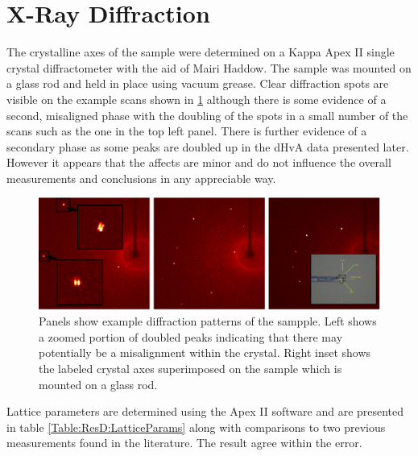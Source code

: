 
\section{X-Ray Diffraction}
    \label{Sec:ResD:XrayDiffraction}

The crystalline axes of the sample were determined on a Kappa Apex II single crystal diffractometer with the aid of Mairi Haddow. The sample was mounted on a glass rod and held in place using vacuum grease. Clear diffraction spots are visible on the example scans shown in \fig\ref{Fig:ResD:XRayDiffraction} although there is some evidence of a second, misaligned phase with the doubling of the spots in a small number of the scans such as the one in the top left panel. There is further evidence of a secondary phase as some peaks are doubled up in the dHvA data presented later. However it appears that the affects are minor and do not influence the overall measurements and conclusions in any appreciable way.
\begin{figure}[htbp]
    \begin{center}
        \includegraphics[scale=0.7]{Chapter-dHvABaFe2P2/Figures/Xrays/XRayDiffraction/XRayDiffraction}
        \caption{Panels show example diffraction patterns of the \BaFeP sampple. Left shows a zoomed portion of doubled peaks indicating that there may potentially be a misalignment within the crystal. Right inset shows the labeled crystal axes superimposed on the sample which is mounted on a glass rod.}
        \label{Fig:ResD:XRayDiffraction}
    \end{center}
\end{figure}
Lattice parameters are determined using the Apex II software and are presented in table \ref{Table:ResD:LatticeParams} along with comparisons to two previous measurements found in the literature. The result agree within the error.
